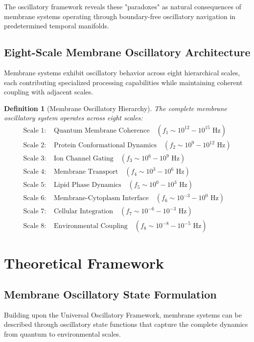 \documentclass[12pt,a4paper]{article}
\newtheorem{definition}{Definition}
\begin{document}
The oscillatory framework reveals these "paradoxes" as natural consequences of membrane systems operating through boundary-free oscillatory navigation in predetermined temporal manifolds.

\subsection{Eight-Scale Membrane Oscillatory Architecture}

Membrane systems exhibit oscillatory behavior across eight hierarchical scales, each contributing specialized processing capabilities while maintaining coherent coupling with adjacent scales.

\begin{definition}[Membrane Oscillatory Hierarchy]
The complete membrane oscillatory system operates across eight scales:
\begin{align}
\text{Scale 1: } &\text{Quantum Membrane Coherence} \quad (f_1 \sim 10^{12}-10^{15} \text{ Hz}) \\
\text{Scale 2: } &\text{Protein Conformational Dynamics} \quad (f_2 \sim 10^9-10^{12} \text{ Hz}) \\
\text{Scale 3: } &\text{Ion Channel Gating} \quad (f_3 \sim 10^6-10^9 \text{ Hz}) \\
\text{Scale 4: } &\text{Membrane Transport} \quad (f_4 \sim 10^3-10^6 \text{ Hz}) \\
\text{Scale 5: } &\text{Lipid Phase Dynamics} \quad (f_5 \sim 10^0-10^3 \text{ Hz}) \\
\text{Scale 6: } &\text{Membrane-Cytoplasm Interface} \quad (f_6 \sim 10^{-3}-10^0 \text{ Hz}) \\
\text{Scale 7: } &\text{Cellular Integration} \quad (f_7 \sim 10^{-6}-10^{-3} \text{ Hz}) \\
\text{Scale 8: } &\text{Environmental Coupling} \quad (f_8 \sim 10^{-8}-10^{-5} \text{ Hz})
\end{align}
\end{definition}

\section{Theoretical Framework}

\subsection{Membrane Oscillatory State Formulation}

Building upon the Universal Oscillatory Framework, membrane systems can be described through oscillatory state functions that capture the complete dynamics from quantum to environmental scales.
\end{document}
